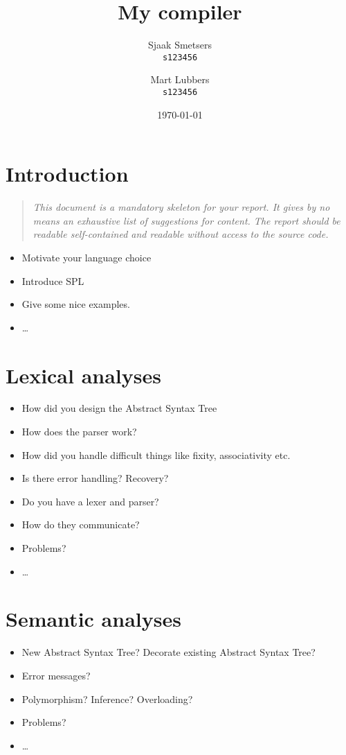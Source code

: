 \documentclass{report}
\author{%
	Sjaak Smetsers\\
	\small\texttt{s123456}\and
	Mart Lubbers\\
	\small\texttt{s123456}
}
\date{\today}
\title{My compiler}
\begin{document}
\maketitle%

\tableofcontents%

\chapter{Introduction}
\begin{quote}
	\it
	This document is a mandatory skeleton for your report.
	It gives by no means an exhaustive list of suggestions for content.
	The report should be readable self-contained and readable without access to the source code.
\end{quote}
\begin{itemize}
	\item Motivate your language choice
	\item Introduce SPL
	\item Give some nice examples.
	\item \ldots
\end{itemize}

\chapter{Lexical analyses}
\begin{itemize}
	\item How did you design the Abstract Syntax Tree
	\item How does the parser work?
	\item How did you handle difficult things like fixity, associativity etc.
	\item Is there error handling? Recovery?
	\item Do you have a lexer and parser?
	\item How do they communicate?
	\item Problems?
	\item\ldots
\end{itemize}

\chapter{Semantic analyses}
\begin{itemize}
	\item New Abstract Syntax Tree? Decorate existing Abstract Syntax Tree?
	\item Error messages?
	\item Polymorphism? Inference? Overloading?
	\item Problems?
	\item\ldots
\end{itemize}
\end{document}
